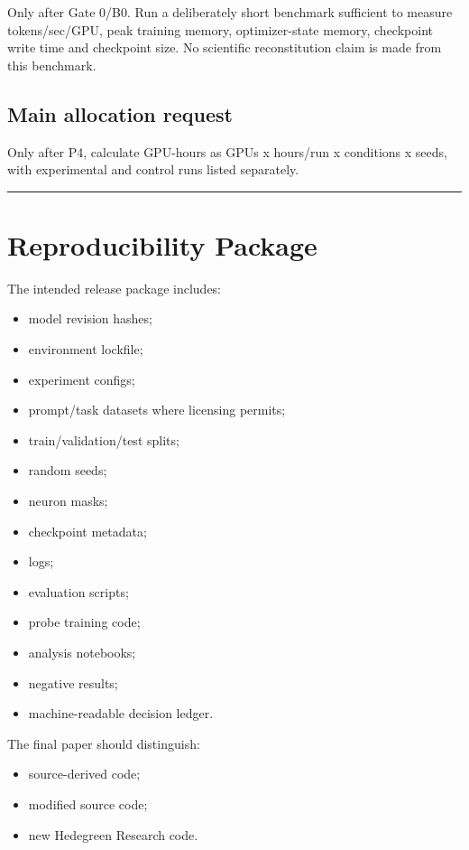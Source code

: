 Only after Gate 0/B0. Run a deliberately short benchmark sufficient to measure tokens/sec/GPU, peak training memory, optimizer-state memory, checkpoint write time and checkpoint size. No scientific reconstitution claim is made from this benchmark.

\subsection{Main allocation request}\label{main-allocation-request}

Only after P4, calculate GPU-hours as GPUs x hours/run x conditions x seeds, with experimental and control runs listed separately.

\begin{center}\rule{0.5\linewidth}{0.5pt}\end{center}

\section{Reproducibility Package}\label{reproducibility-package}

The intended release package includes:

\begin{itemize}
\tightlist
\item
  model revision hashes;
\item
  environment lockfile;
\item
  experiment configs;
\item
  prompt/task datasets where licensing permits;
\item
  train/validation/test splits;
\item
  random seeds;
\item
  neuron masks;
\item
  checkpoint metadata;
\item
  logs;
\item
  evaluation scripts;
\item
  probe training code;
\item
  analysis notebooks;
\item
  negative results;
\item
  machine-readable decision ledger.
\end{itemize}

The final paper should distinguish:

\begin{itemize}
\tightlist
\item
  source-derived code;
\item
  modified source code;
\item
  new Hedegreen Research code.
\end{itemize}

